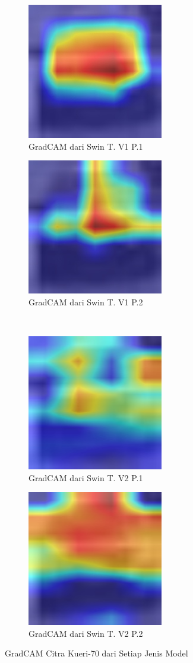 \begin{figure}[h!]
  \centering
  \begin{subfigure}{.4\textwidth}
    \centering
    \includegraphics[width=.3\linewidth]{gambar/Que70_gradCAMV1P1IT3.jpg}
    \caption{GradCAM dari Swin T. V1 P.1}
    \label{gradcamkuerinomortujuhpuluhV1P1}
  \end{subfigure}%
  \begin{subfigure}{.4\textwidth}
    \centering
    \includegraphics[width=.3\linewidth]{gambar/Que70_gradCAMV1P2IT2.jpg}
    \caption{GradCAM dari Swin T. V1 P.2}
    \label{gradcamkuerinomortujuhpuluhV1P2}
  \end{subfigure}%
  \\
  \begin{subfigure}{.4\textwidth}
    \centering
    \includegraphics[width=.3\linewidth]{gambar/Que70_V2P1IT1.png}
    \caption{GradCAM dari Swin T. V2 P.1}
    \label{gradcamkuerinomortujuhpuluhV2P1}
  \end{subfigure}%
  \begin{subfigure}{.4\textwidth}
    \centering
    \includegraphics[width=.3\linewidth]{gambar/Que70_V2P2IT3.png}
    \caption{GradCAM dari Swin T. V2 P.2}
    \label{gradcamkuerinomortujuhpuluhV2P2}
  \end{subfigure}
  \caption{GradCAM Citra Kueri-70 dari Setiap Jenis Model}
  \label{fig:gradcamdarisetiapjenismodelpengujianketujuh}
\end{figure}

